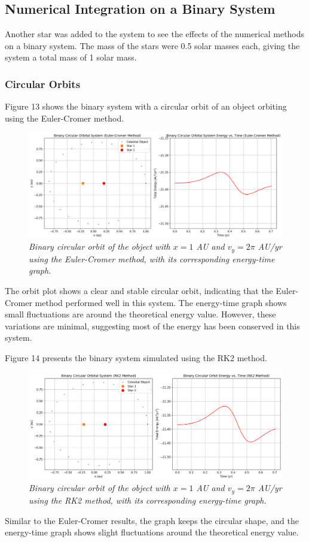 \documentclass[11 pt, a4paper, twocolumn]{article}
\begin{document}
\subsection{Numerical Integration on a Binary System}
Another star was added to the system to see the effects of the numerical methods on a binary system. The mass of the stars were 0.5 solar masses each, giving the system a total mass of 1 solar mass.
\vspace{-3em}
\subsubsection{Circular Orbits}
Figure 13 shows the binary system with a circular orbit of an object orbiting using the Euler-Cromer 
method.
\begin{figure}[H]
  \includegraphics[width=1\linewidth]{binaryeulercircular.png}
  \centering
  \caption{\textit{Binary circular orbit of the object with $x = 1$ AU and $v_y = 2\pi$ AU/yr using 
  the Euler-Cromer method, with its corresponding energy-time graph.}} 
\end{figure}
\vspace{-1.5em}
The orbit plot shows a clear and stable circular orbit, indicating that the Euler-Cromer method performed
well in this system. The energy-time graph shows small fluctuations are around the theoretical energy 
value. However, these variations are minimal, suggesting most of the energy has been conserved in this 
system.

Figure 14 presents the binary system simulated using the RK2 method.
\begin{figure}[H]
  \includegraphics[width=1\linewidth]{binaryrk2circular.png}
  \centering
  \caption{\textit{Binary circular orbit of the object with $x = 1$ AU and $v_y = 2\pi$ AU/yr using the 
  RK2 method, with its corresponding energy-time graph.}} 
\end{figure}
\vspace{-1.5em}
Similar to the Euler-Cromer results, the graph keeps the circular shape, and the energy-time graph
shows slight fluctuations around the theoretical energy value.
\end{document}
